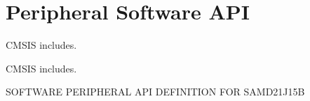 \hypertarget{group___s_a_m_d21_j15_b__api}{}\section{Peripheral Software A\+PI}
\label{group___s_a_m_d21_j15_b__api}


C\+M\+S\+IS includes.  


C\+M\+S\+IS includes. 

S\+O\+F\+T\+W\+A\+RE P\+E\+R\+I\+P\+H\+E\+R\+AL A\+PI D\+E\+F\+I\+N\+I\+T\+I\+ON F\+OR S\+A\+M\+D21\+J15B 